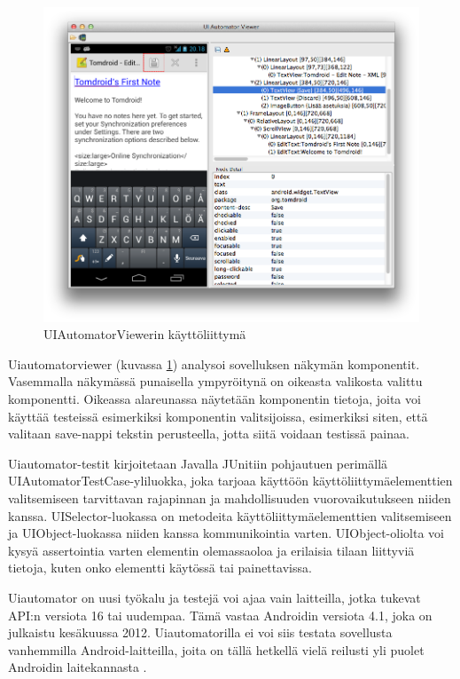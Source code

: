\begin{figure}[htb]
\includegraphics[width=160mm]{uiautomatorviewer.png}
\caption{UIAutomatorViewerin käyttöliittymä} \label{uiautomatorviewer}
\end{figure}

Uiautomatorviewer (kuvassa \ref{uiautomatorviewer}) analysoi sovelluksen näkymän komponentit. Vasemmalla näkymässä punaisella ympyröitynä on oikeasta valikosta valittu komponentti. Oikeassa alareunassa näytetään komponentin tietoja, joita voi käyttää testeissä esimerkiksi komponentin valitsijoissa, esimerkiksi siten, että valitaan save-nappi tekstin perusteella, jotta siitä voidaan testissä painaa.

Uiautomator-testit kirjoitetaan Javalla JUnitiin pohjautuen perimällä UIAutomatorTestCase-yliluokka, joka tarjoaa käyttöön käyttöliittymäelementtien valitsemiseen tarvittavan rajapinnan ja mahdollisuuden vuorovaikutukseen niiden kanssa. UISelector-luokassa on metodeita käyttöliittymäelementtien valitsemiseen ja UIObject-luokassa niiden kanssa kommunikointia varten. UIObject-oliolta voi kysyä assertointia varten elementin olemassaoloa ja erilaisia tilaan liittyviä tietoja, kuten onko elementti käytössä tai painettavissa.

Uiautomator on uusi työkalu ja testejä voi ajaa vain laitteilla, jotka tukevat API:n versiota 16 tai uudempaa. Tämä vastaa Androidin versiota 4.1, joka on julkaistu kesäkuussa 2012. Uiautomatorilla ei voi siis testata sovellusta vanhemmilla Android-laitteilla, joita on tällä hetkellä vielä reilusti yli puolet Androidin laitekannasta \cite{android}.

